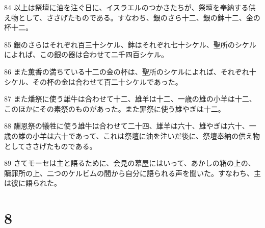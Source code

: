 \par 84 以上は祭壇に油を注ぐ日に、イスラエルのつかさたちが、祭壇を奉納する供え物として、ささげたものである。すなわち、銀のさら十二、銀の鉢十二、金の杯十二。
\par 85 銀のさらはそれぞれ百三十シケル、鉢はそれぞれ七十シケル、聖所のシケルによれば、この銀の器は合わせて二千四百シケル。
\par 86 また薫香の満ちている十二の金の杯は、聖所のシケルによれば、それぞれ十シケル、その杯の金は合わせて百二十シケルであった。
\par 87 また燔祭に使う雄牛は合わせて十二、雄羊は十二、一歳の雄の小羊は十二、このほかにその素祭のものがあった。また罪祭に使う雄やぎは十二。
\par 88 酬恩祭の犠牲に使う雄牛は合わせて二十四、雄羊は六十、雄やぎは六十、一歳の雄の小羊は六十であって、これは祭壇に油を注いだ後に、祭壇奉納の供え物としてささげたものである。
\par 89 さてモーセは主と語るために、会見の幕屋にはいって、あかしの箱の上の、贖罪所の上、二つのケルビムの間から自分に語られる声を聞いた。すなわち、主は彼に語られた。

\chapter{8}

